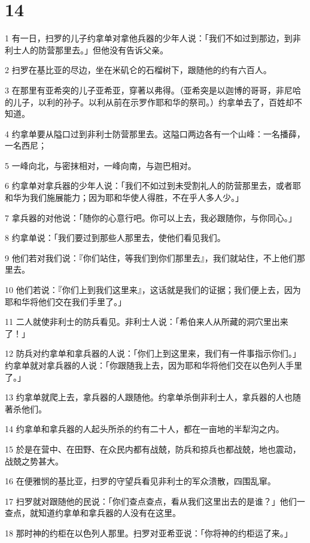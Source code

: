 \chapter{14}

\par 1 有一日，扫罗的儿子约拿单对拿他兵器的少年人说：「我们不如过到那边，到非利士人的防营那里去。」但他没有告诉父亲。
\par 2 扫罗在基比亚的尽边，坐在米矶仑的石榴树下，跟随他的约有六百人。
\par 3 在那里有亚希突的儿子亚希亚，穿著以弗得。（亚希突是以迦博的哥哥，非尼哈的儿子，以利的孙子。以利从前在示罗作耶和华的祭司。）约拿单去了，百姓却不知道。
\par 4 约拿单要从隘口过到非利士防营那里去。这隘口两边各有一个山峰：一名播薛，一名西尼；
\par 5 一峰向北，与密抹相对，一峰向南，与迦巴相对。
\par 6 约拿单对拿兵器的少年人说：「我们不如过到未受割礼人的防营那里去，或者耶和华为我们施展能力；因为耶和华使人得胜，不在乎人多人少。」
\par 7 拿兵器的对他说：「随你的心意行吧。你可以上去，我必跟随你，与你同心。」
\par 8 约拿单说：「我们要过到那些人那里去，使他们看见我们。
\par 9 他们若对我们说：『你们站住，等我们到你们那里去』，我们就站住，不上他们那里去。
\par 10 他们若说：『你们上到我们这里来』，这话就是我们的证据；我们便上去，因为耶和华将他们交在我们手里了。」
\par 11 二人就使非利士的防兵看见。非利士人说：「希伯来人从所藏的洞穴里出来了！」
\par 12 防兵对约拿单和拿兵器的人说：「你们上到这里来，我们有一件事指示你们。」约拿单就对拿兵器的人说：「你跟随我上去，因为耶和华将他们交在以色列人手里了。」
\par 13 约拿单就爬上去，拿兵器的人跟随他。约拿单杀倒非利士人，拿兵器的人也随著杀他们。
\par 14 约拿单和拿兵器的人起头所杀的约有二十人，都在一亩地的半犁沟之内。
\par 15 於是在营中、在田野、在众民内都有战兢，防兵和掠兵也都战兢，地也震动，战兢之势甚大。
\par 16 在便雅悯的基比亚，扫罗的守望兵看见非利士的军众溃散，四围乱窜。
\par 17 扫罗就对跟随他的民说：「你们查点查点，看从我们这里出去的是谁？」他们一查点，就知道约拿单和拿兵器的人没有在这里。
\par 18 那时神的约柜在以色列人那里。扫罗对亚希亚说：「你将神的约柜运了来。」
